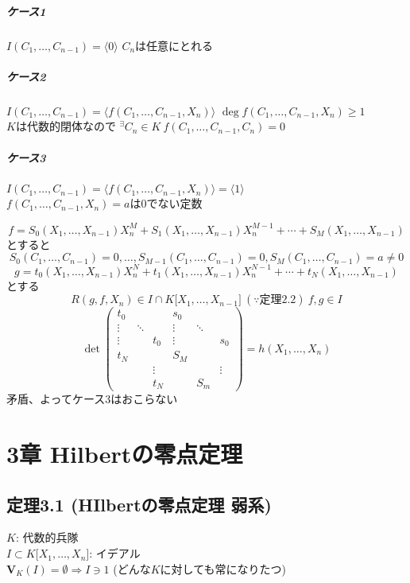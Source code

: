\documentclass[12pt,a4paper]{article}
\begin{document}
      \subparagraph{ケース1 \\}
        $I(C_1, \ldots, C_{n-1}) = \langle 0 \rangle$ $C_n$は任意にとれる
      \subparagraph{ケース2 \\}
        $I(C_1, \ldots, C_{n-1}) = \langle f(C_1, \ldots, C_{n-1}, X_n) \rangle$
        $\deg f(C_1, \ldots, C_{n-1}, X_n) \geq 1 $ \\
        $K$は代数的閉体なので ${}^\exists C_n \in K \ f(C_1, \ldots, C_{n-1} , C_n) = 0$
      \subparagraph{ケース3 \\}
        $I(C_1, \ldots, C_{n-1}) = \langle f(C_1, \ldots, C_{n-1}, X_n) \rangle = \langle 1 \rangle$ \\
        $f(C_1, \ldots, C_{n-1}, X_n) = a$は$0$でない定数

        \[ f = S_0 (X_1, \ldots, X_{n-1} ) X_n^M + S_1(X_1, \ldots, X_{n-1})X_n^{M-1} + \cdots + S_M (X_1, \ldots, X_{n-1}) \]
        とすると
        \[S_0(C_1, \ldots, C_{n-1}) = 0, \ldots, S_{M-1} (C_1, \ldots, C_{n-1}) = 0, S_M (C_1,\ldots, C_{n-1}) = a \neq 0 \]
        \[g = t_0 (X_1, \ldots, X_{n-1})X_n^N + t_1(X_1, \ldots, X_{n-1})X_n^{N-1} + \cdots + t_N (X_1, \ldots, X_{n-1}) \]
        とする
        \[ R(g, f, X_n) \in I \cap K \lbrack X_1, \ldots, X_{n-1} \rbrack \ (\because \text{定理2.2}) \ f,g\in I\]
        \[ \det \begin{pmatrix}
            t_0 & & & s_0 & & \\
            \vdots & \ddots & & \vdots & \ddots & \\
            \vdots &  & t_0 & \vdots & & s_0 \\
            t_N & & & S_M & & \\
             & & \vdots & & & \vdots \\
              & & t_N & & S_m
          \end{pmatrix}  = h(X_1, \ldots, X_n)  \]
          矛盾、よってケース3はおこらない

\section*{3章 Hilbertの零点定理}
\subsection*{定理3.1 (HIlbertの零点定理 弱系)}
  $K$: 代数的兵隊\\
  $I \subset K \lbrack X_1, \ldots, X_n \rbrack$: イデアル \\
  $\mathbf{V}_K (I) = \emptyset \Rightarrow I \ni 1$ (どんな$K$に対しても常になりたつ)
\end{document}
